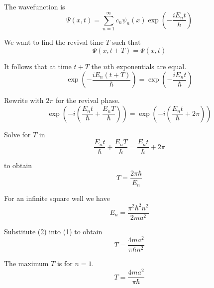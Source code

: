 


\bigskip
The wavefunction is
\begin{equation*}
\Psi(x,t)=\sum_{n=1}^\infty c_n\psi_n(x)\exp\left(-\frac{iE_nt}{\hbar}\right)
\end{equation*}

We want to find the revival time $T$ such that
\begin{equation*}
\Psi(x,t+T)=\Psi(x,t)
\end{equation*}

It follows that at time $t+T$ the $n$th exponentials are equal.
\begin{equation*}
\exp\left(-\frac{iE_n(t+T)}{\hbar}\right)
=\exp\left(-\frac{iE_nt}{\hbar}\right)
\end{equation*}

Rewrite with $2\pi$ for the revival phase.
\begin{equation*}
\exp\left(-i\left(\frac{E_nt}{\hbar}+\frac{E_nT}{\hbar}\right)\right)
=\exp\left(-i\left(\frac{E_nt}{\hbar}+2\pi\right)\right)
\end{equation*}

Solve for $T$ in
\begin{equation*}
\frac{E_nt}{\hbar}+\frac{E_nT}{\hbar}=\frac{E_nt}{\hbar}+2\pi
\end{equation*}

to obtain
\begin{equation*}
T=\frac{2\pi\hbar}{E_n}
\tag{1}
\end{equation*}

For an infinite square well we have
\begin{equation*}
E_n=\frac{\pi^2\hbar^2 n^2}{2ma^2}
\tag{2}
\end{equation*}

Substitute (2) into (1) to obtain
\begin{equation*}
T=\frac{4ma^2}{\pi\hbar n^2}
\end{equation*}

The maximum $T$ is for $n=1$.
\begin{equation*}
T=\frac{4ma^2}{\pi\hbar}
\end{equation*}


